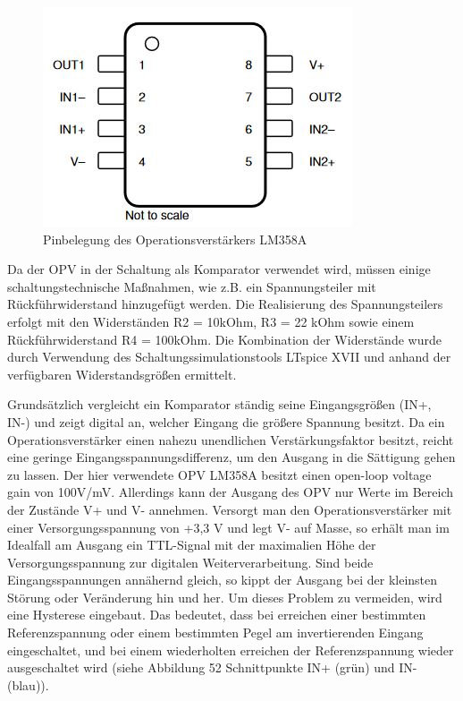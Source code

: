 \begin{figure}[H] %
\includegraphics[width=.50\textwidth]{sec4/images/OPV_Pinbelegung} 
\centering
\captionsetup{width=.95\textwidth}
\caption[Pinbelegung des Operationsverstärkers LM358A]{Pinbelegung des Operationsverstärkers LM358A}\centering
\label{fig:OPVPinbelegung}
\end{figure}


Da der \ac{OPV} in der Schaltung als Komparator verwendet wird, müssen einige schaltungstechnische Maßnahmen, wie z.B. ein Spannungsteiler mit Rückführwiderstand hinzugefügt werden. Die Realisierung des Spannungsteilers erfolgt mit den Widerständen R2 = 10kOhm, R3 = 22 kOhm sowie einem Rückführwiderstand R4 = 100kOhm. Die Kombination der Widerstände wurde durch Verwendung des Schaltungssimulationstools LTspice XVII und anhand der verfügbaren Widerstandsgrößen ermittelt.\vspace{11pt}

Grundsätzlich vergleicht ein Komparator ständig seine Eingangsgrößen (IN+, IN-) und zeigt digital an, welcher Eingang die größere Spannung besitzt. Da ein Operationsverstärker einen nahezu unendlichen Verstärkungsfaktor besitzt, reicht eine geringe Eingangsspannungsdifferenz, um den Ausgang in die Sättigung gehen zu lassen. Der hier verwendete OPV LM358A besitzt einen open-loop voltage gain von 100V/mV. Allerdings kann der Ausgang des OPV nur Werte im Bereich der Zustände V+ und V- annehmen. Versorgt man den Operationsverstärker mit einer Versorgungsspannung von +3,3 V und legt V- auf Masse, so erhält man im Idealfall am Ausgang ein TTL-Signal mit der maximalien Höhe der Versorgungsspannung zur digitalen Weiterverarbeitung. Sind beide Eingangsspannungen annähernd gleich, so kippt der Ausgang bei der kleinsten Störung oder Veränderung hin und her. Um dieses Problem zu vermeiden, wird eine Hysterese eingebaut. Das bedeutet, dass bei erreichen einer bestimmten Referenzspannung oder einem bestimmten Pegel am invertierenden Eingang eingeschaltet, und bei einem wiederholten erreichen der Referenzspannung wieder ausgeschaltet wird (siehe Abbildung 52 Schnittpunkte IN+ (grün) und IN- (blau)).\vspace{11pt}

